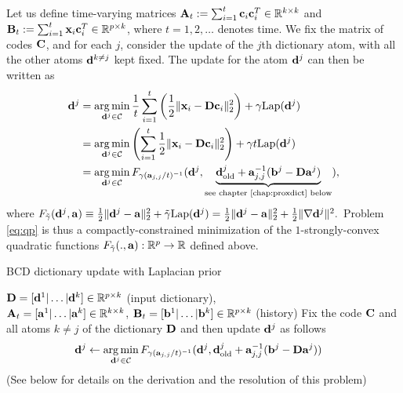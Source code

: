 Let us define time-varying matrices $\mathbf{A}_t := \sum_{i=1}^t\mathbf{c}_i\mathbf{c}_i^T \in \mathbb R^{k \times k}$ and $\mathbf{B}_t := \sum_{i=1}^t\mathbf{x}_i\mathbf{c}_i^T \in \mathbb R^{p \times k}$, where $t=1,2,\ldots$ denotes time. We fix the matrix of codes $\mathbf{C}$, and for each $j$, consider the update of the $j$th dictionary atom, with all the other atoms $\mathbf{d}^{k\ne j}$
kept fixed. The update for the atom $\mathbf{d}^j$ can then be written as
\begin{eqnarray}
  \label{eq:qp}
\begin{split}
  \mathbf{d}^j &= \operatorname*{arg\,min}_{\mathbf{d}^j \in \mathcal C}\frac{1}{t}\sum_{i=1}^t\left(\frac{1}{2}\|\mathbf{x}_i
  -\mathbf{D}\mathbf{c}_i\|_{2}^2\right) + \gamma{\text{Lap}}(\mathbf{d}^j)\\
  &=\operatorname*{arg\,min}_{\mathbf{d}^j \in \mathcal C}\left(\sum_{i=1}^t\frac{1}{2}\|\mathbf{x}_i -\mathbf{D}\mathbf{c}_i\|_{2}^2\right)
  + \gamma t{\text{Lap}}(\mathbf{d}^j)\\
  &=\operatorname*{arg\,min}_{\mathbf{d}^j \in \mathcal C}F_{\gamma (\mathbf{a}_{j,j}/t)^{-1}}(\mathbf{d}^j, \underbrace{\mathbf{d}^j_{\text{old}} + \mathbf{a}_{j,j}^{-1}(\mathbf{b}^j - \mathbf{D}\mathbf{a}^j)}_{\text{see chapter \ref{chap:proxdict} below}}),
\end{split}
\end{eqnarray}
where
$F_{\tilde{\gamma}}(\mathbf{d}^j,\mathbf{a}) \equiv \frac{1}{2}\|\mathbf{d}^j - \mathbf{a}\|_2^2
  + \tilde{\gamma}{\text{Lap}}(\mathbf{d}^j) = \frac{1}{2}\|\mathbf{d}^j - \mathbf{a}\|_2^2
  + \frac{1}{2}\|\nabla \mathbf{d}^j\|^2.
$
Problem \eqref{eq:qp} is thus a compactly-constrained minimization of the $1$-strongly-convex quadratic functions $F_{\tilde{\gamma}}(.,\mathbf{a}): \mathbb R^p \rightarrow \mathbb R$ defined above. 
\begin{algorithm}
  \caption{BCD dictionary update with Laplacian prior}
  \label{Tab:algo_sobdict}
  \begin{algorithmic}[1]
    \Require $\mathbf{D} = [\mathbf{d}^1|\ldots|\mathbf{d}^k] \in \mathbb{R}^{p \times k}$ (input
    dictionary),\\
    $\mathbf{A}_t = [\mathbf{a}^1|\ldots|\mathbf{a}^k] \in \mathbb R^{k \times k}$, $\mathbf{B}_t =
    [\mathbf{b}^1|\ldots|\mathbf{b}^k] \in \mathbb R^{p \times k}$ (history)
    \State Fix the code $\mathbf{C}$ and all atoms $k \ne j$ of the
    dictionary $\mathbf{D}$ and then update $\mathbf{d}^j$ as follows
    \begin{eqnarray}
      \begin{split}
        \mathbf{d}^j &\leftarrow \operatorname*{arg\,min}_{\mathbf{d}^j \in \mathcal C}F_{\gamma (\mathbf{a}_{j,j}/t)^{-1}}(\mathbf{d}^j, \mathbf{d}^j_{\text{old}} + \mathbf{a}_{j,j}^{-1}(\mathbf{b}^j - \mathbf{D}\mathbf{a}^j))
      \end{split}
                  \label{eq:v_sob}
    \end{eqnarray}
    \hspace{1.6cm}(See below for details on the derivation and the resolution of this problem)
    \EndFor
    \EndWhile
  \end{algorithmic}
\end{algorithm}
